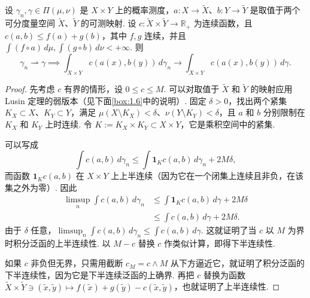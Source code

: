 \begin{lemma}\label{obj:1.8}
设 $\gamma_n,\gamma\in\Pi(\mu,\nu)$ 是 $X\times Y$ 上的概率测度，$a:X\to\widetilde X$、$b:Y\to\widetilde Y$ 是取值于两个可分度量空间 $\widetilde X$、$\widetilde Y$ 的可测映射. 设 $c:\widetilde X\times\widetilde Y\to\mathbb R_+$ 为连续函数，且 $c(a,b)\le f(a)+g(b)$，其中 $f,g$ 连续，并且 $\int(f\circ a)\,d\mu,\int(g\circ b)\,d\nu<+\infty$. 则
\[
\gamma_n\rightharpoonup\gamma\implies
\int_{X\times Y}c(a(x),b(y))\,d\gamma_n\to
\int_{X\times Y}c(a(x),b(y))\,d\gamma.
\]
\end{lemma}
\begin{proof}
先考虑 $c$ 有界的情形，设 $0\le c\le M$. 可以对取值于 $\widetilde X$ 和 $\widetilde Y$ 的映射应用 Lusin 定理的弱版本（见下面\autoref{box:1.6}中的说明）. 固定 $\delta>0$，找出两个紧集 $K_X\subset X$、$K_Y\subset Y$，满足 $\mu(X\setminus K_X)<\delta$、$\nu(Y\setminus K_Y)<\delta$，且 $a$ 和 $b$ 分别限制在 $K_X$ 和 $K_Y$ 上时连续. 令 $K:=K_X\times K_Y\subset X\times Y$，它是乘积空间中的紧集.

可以写成
\[
\int c(a,b)\,d\gamma_n\le\int\mathbf1_K c(a,b)\,d\gamma_n+2M\delta,
\]
而函数 $\mathbf1_K c(a,b)$ 在 $X\times Y$ 上上半连续（因为它在一个闭集上连续且非负，在该集之外为零）. 因此
\begin{equation*}
\begin{aligned}
\limsup_n\int c(a,b)\,d\gamma_n
&\le\int\mathbf1_K c(a,b)\,d\gamma+2M\delta\\
&\le\int c(a,b)\,d\gamma+2M\delta.
\end{aligned}
\end{equation*}
由于 $\delta$ 任意，$\limsup_n\int c(a,b)\,d\gamma_n\le\int c(a,b)\,d\gamma$. 这就证明了当 $c$ 以 $M$ 为界时积分泛函的上半连续性. 以 $M-c$ 替换 $c$ 作类似计算，即得下半连续性.

如果 $c$ 非负但无界，只需用截断 $c_M=c\wedge M$ 从下方逼近它，就证明了积分泛函的下半连续性，因为它是下半连续泛函的上确界. 再把 $c$ 替换为函数 $\widetilde X\times\widetilde Y\ni(\widetilde x,\widetilde y)\mapsto f(\widetilde x)+g(\widetilde y)-c(\widetilde x,\widetilde y)$，也就证明了上半连续性.
\end{proof}

